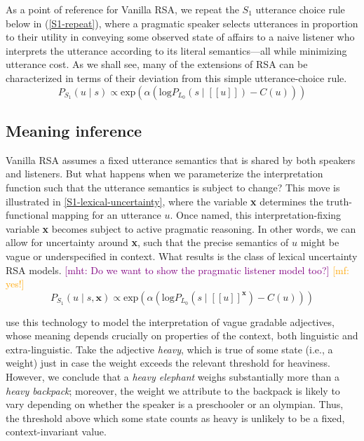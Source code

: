 \documentclass{sp}
\newcommand{\mf}[1]{\textcolor{orange}{[mf: #1]}}
\newcommand{\mht}[1]{\textcolor{purple}{[mht: #1]}}
\newcommand{\sem}[1]{\ensuremath{[\![#1]\!]}}
\begin{document}
As a point of reference for Vanilla RSA, we repeat the $S_1$ utterance choice rule below in (\ref{S1-repeat}), where a pragmatic speaker selects utterances in proportion to their utility in conveying some observed state of affairs to a naive listener who interprets the utterance according to its literal semantics---all while minimizing utterance cost. As we shall see, many of the extensions of RSA can be characterized in terms of their deviation from this simple utterance-choice rule.
\begin{equation} \label{S1-repeat}
P_{S_1}(u\mid s) \propto \textrm{exp}(\alpha (\textrm{log}P_{L_0}(s\mid \sem{u}) - C(u)))
\end{equation}

\subsection{Meaning inference} \label{meaning-inference}

Vanilla RSA assumes a fixed utterance semantics that is shared by both speakers and listeners. But what happens when we parameterize the interpretation function such that the utterance semantics is subject to change? This move is illustrated in \eqref{S1-lexical-uncertainty}, where the variable \textbf{x} determines the truth-functional mapping for an utterance $u$. Once named, this interpretation-fixing variable \textbf{x} becomes subject to active pragmatic reasoning. In other words, we can allow for uncertainty around \textbf{x}, such that the precise semantics of $u$ might be vague or underspecified in context. What results is the class of lexical uncertainty RSA models. \mht{Do we want to show the pragmatic listener model too?} \mf{yes!}
\begin{equation} \label{S1-lexical-uncertainty}
P_{S_1}(u\mid s, \textbf{x}) \propto \textrm{exp}(\alpha (\textrm{log}P_{L_0}(s\mid \sem{u}^{\textbf{x}}) - C(u)))
\end{equation}

\cite{lassitergoodman2013} use this technology to model the interpretation of vague gradable adjectives, whose meaning depends crucially on properties of the context, both linguistic and extra-linguistic. Take the adjective \emph{heavy}, which is true of some state (i.e., a weight) just in case the weight exceeds the relevant threshold for heaviness. However, we conclude that a \emph{heavy elephant} weighs substantially more than a \emph{heavy backpack}; moreover, the weight we attribute to the backpack is likely to vary depending on whether the speaker is a preschooler or an olympian. Thus, the threshold above which some state counts as heavy is unlikely to be a fixed, context-invariant value.
\end{document}
